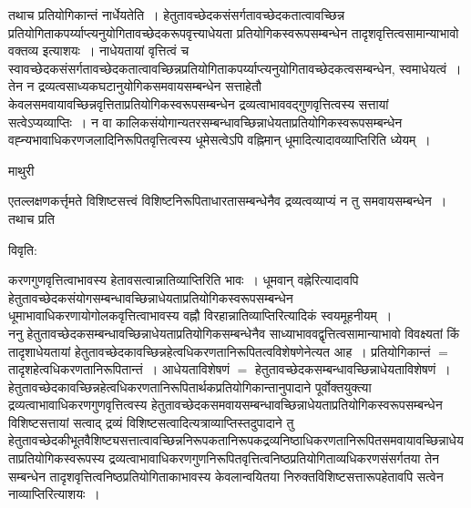 \documentclass[10pt, openany]{book}
\begin{document}
{तथाच प्रतियोगिकान्तं नार्धेयतेति~। हेतुतावच्छेदकसंसर्गतावच्छेदकतात्वावच्छिन्न प्रतियोगिताकपर्य्याप्त्यनुयोगितावच्छेदकरूपवृत्त्याधेयता प्रतियोगिकस्वरूपसम्बन्धेन तादृशवृत्तित्वसामान्याभावो वक्तव्य इत्याशयः~। नाधेयतायां वृत्तित्वं च स्वावच्छेदकसंसर्गतावच्छेदकतात्वावच्छिन्नप्रतियोगिताकपर्य्याप्त्यनुयोगितावच्छेदकत्वसम्बन्धेन, स्वमाधेयत्वं~। तेन न द्रव्यत्वसाध्यकघटानुयोगिकसमवायसम्बन्धेन सत्ताहेतौ केवलसमवायावच्छिन्नवृत्तिताप्रतियोगिकस्वरूपसम्बन्धेन द्रव्यत्वाभाववद्गुणवृत्तित्वस्य सत्तायां सत्वेऽप्यव्याप्तिः~। न वा कालिकसंयोगान्यतरसम्बन्धावच्छिन्नाधेयताप्रतियोगिकस्वरूपसम्बन्धेन वह्न्यभावाधिकरणजलादिनिरूपितवृत्तित्वस्य धूमेसत्वेऽपि वह्निमान् धूमादित्यादावव्याप्तिरिति ध्येयम्~।
\newpage
\lfoot{}
\begin{center}  माथुरी  \end{center}

{
 एतल्लक्षणकर्त्तृमते विशिष्टसत्त्वं विशिष्टनिरूपिताधारतासम्बन्धेनैव द्रव्यत्वव्याप्यं न तु समवायसम्बन्धेन~। तथाच प्रति}
\begin{center}
विवृति:
\end{center}
करणगुणवृत्तित्वाभावस्य हेतावसत्वान्नातिव्याप्तिरिति भावः~। धूमवान् वह्नेरित्यादावपि हेतुतावच्छेदकसंयोगसम्बन्धावच्छिन्नाधेयताप्रतियोगिकस्वरूपसम्बन्धेन
धूमाभावाधिकरणायोगोलकवृत्तित्वाभावस्य वह्नौ विरहान्नातिव्याप्तिरित्यादिकं स्वयमूहनीयम्~।\\

ननु हेतुतावच्छेदकसम्बन्धावच्छिन्नाधेयताप्रतियोगिकसम्बन्धेनैव साध्याभाववद्वृत्तित्वसामान्याभावो विवक्ष्यतां किं तादृशाधेयतायां
हेतुतावच्छेदकावच्छिन्नहेत्वधिकरणतानिरूपितत्वविशेषणेनेत्यत आह~। प्रतियोगिकान्तं $=$  तादृशहेत्वधिकरणतानिरूपितान्तं~। आधेयताविशेषणं $=$ हेतुतावच्छेदकसम्बन्धावच्छिन्नाधेयताविशेषणं~। हेतुतावच्छेदकावच्छिन्नहेत्वधिकरणतानिरूपितार्थकप्रतियोगिकान्तानुपादाने पूर्वोक्तयुक्त्या
द्रव्यत्वाभावाधिकरणगुणवृत्तित्वस्य हेतुतावच्छेदकसमवायसम्बन्धावच्छिन्नाधेयताप्रतियोगिकस्वरूपसम्बन्धेन विशिष्टसत्तायां सत्वाद् द्रव्यं विशिष्टसत्वादित्यत्राव्याप्तिस्तदुपादाने तु हेतुतावच्छेदकीभूतवैशिष्ट्यसत्तात्वावच्छिन्ननिरूपकतानिरूपकद्रव्यनिष्ठाधिकरणतानिरूपितसमवायावच्छिन्नाधेयताप्रतियोगिकस्वरूपस्य द्रव्यत्वाभावाधिकरणगुणनिरूपितवृत्तित्वनिष्ठप्रतियोगिताव्यधिकरणसंसर्गतया तेन सम्बन्धेन तादृशवृत्तित्वनिष्ठप्रतियोगिताकाभावस्य केवलान्वयितया निरुक्तविशिष्टसत्तारूपहेतावपि सत्वेन नाव्याप्तिरित्याशयः~।\\


}
\end{document}
